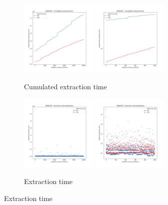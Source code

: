 \begin{figure}
    \centering
    \begin{subfigure}[b]{\textwidth}
        \centering
        \includegraphics[width=0.40\textwidth]{./fragments/04_experimental_execution/images/01_basebenchmark_01_random_case.png.0_0.png}
        \includegraphics[width=0.40\textwidth]{./fragments/04_experimental_execution/images/01_basebenchmark_01_random_case.png.0_1.png}
        \caption{Cumulated extraction time}
        \label{FIG:BENCHMARK_01_RANDOM_CASE__0_0}
    \end{subfigure}

    \begin{subfigure}[b]{\textwidth}
        \centering
        \includegraphics[width=0.40\textwidth]{./fragments/04_experimental_execution/images/01_basebenchmark_01_random_case.png.1_0.png}
        \includegraphics[width=0.40\textwidth]{./fragments/04_experimental_execution/images/01_basebenchmark_01_random_case.png.1_1.png}
        \caption{Extraction time}
        \label{FIG:BENCHMARK_01_RANDOM_CASE__0_0}
    \end{subfigure}


\end{figure}
